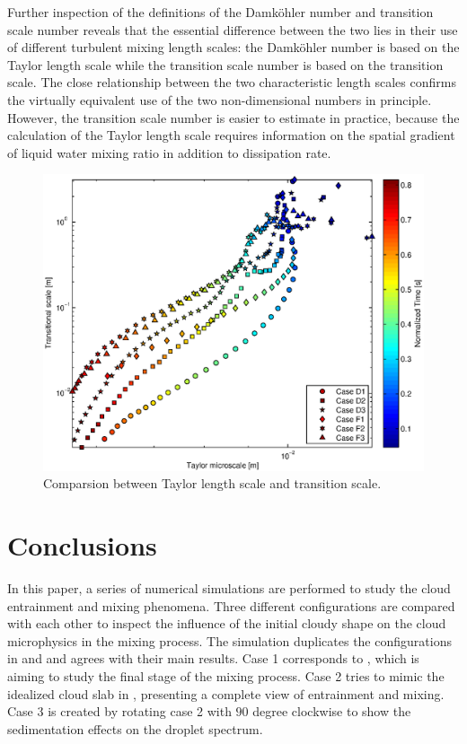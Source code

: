 \documentclass[draft,jgrga]{AGUTeX}
\begin{document}
\begin{article}
Further inspection of the definitions of the Damk\"ohler number and transition scale number reveals that the essential difference between the two lies in their use of different turbulent mixing length scales: the Damk\"ohler number is based on the Taylor length scale while the transition scale number is based on the transition scale. The close relationship between the two characteristic length scales  confirms the virtually equivalent use of the two non-dimensional numbers in principle. However, the transition scale number is easier to estimate in practice, because the calculation of the Taylor length scale requires information on the spatial gradient of liquid water mixing ratio in addition to dissipation rate.    
\begin{figure}\centering
\includegraphics[width=0.5\linewidth]{Figures/taylor_trans}
\caption{Comparsion between Taylor length scale and transition scale.\label{TaylorScaleTranScale}}
\end{figure}

\section{Conclusions}\label{conclusion}
In this paper, a series of numerical simulations are performed to study the cloud entrainment and mixing phenomena. Three different configurations are compared with each other to inspect the influence of the initial cloudy shape on the cloud microphysics in the mixing process. The simulation duplicates the configurations in \cite{And04} and \cite{Kumar11} and agrees with their main results. Case 1 corresponds to \cite{And04}, which is aiming to study the final stage of the mixing process. Case 2 tries to mimic the idealized cloud slab in \cite{Kumar11}, presenting a complete view of entrainment and mixing. Case 3 is created by rotating case 2 with $90$ degree clockwise to show the sedimentation effects on the droplet spectrum.


\end{article}
\end{document}

